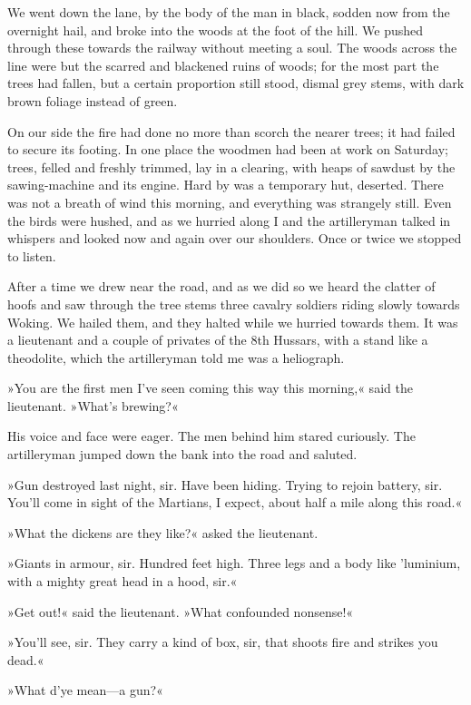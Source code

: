 We went down the lane, by the body of the man in black, sodden now from the overnight hail, and broke into the woods at the foot of the hill. We pushed through these towards the railway without meeting a soul. The woods across the line were but the scarred and blackened ruins of woods; for the most part the trees had fallen, but a certain proportion still stood, dismal grey stems, with dark brown foliage instead of green.

On our side the fire had done no more than scorch the nearer trees; it had failed to secure its footing. In one place the woodmen had been at work on Saturday; trees, felled and freshly trimmed, lay in a clearing, with heaps of sawdust by the sawing-machine and its engine. Hard by was a temporary hut, deserted. There was not a breath of wind this morning, and everything was strangely still. Even the birds were hushed, and as we hurried along I and the artilleryman talked in whispers and looked now and again over our shoulders. Once or twice we stopped to listen.



After a time we drew near the road, and as we did so we heard the clatter of hoofs and saw through the tree stems three cavalry soldiers riding slowly towards Woking. We hailed them, and they halted while we hurried towards them. It was a lieutenant and a couple of privates of the 8th Hussars, with a stand like a theodolite, which the artilleryman told me was a heliograph.

»You are the first men I've seen coming this way this morning,« said the lieutenant. »What's brewing?«

His voice and face were eager. The men behind him stared curiously. The artilleryman jumped down the bank into the road and saluted.

»Gun destroyed last night, sir. Have been hiding. Trying to rejoin battery, sir. You'll come in sight of the Martians, I expect, about half a mile along this road.«

»What the dickens are they like?« asked the lieutenant.

»Giants in armour, sir. Hundred feet high. Three legs and a body like 'luminium, with a mighty great head in a hood, sir.«

»Get out!« said the lieutenant. »What confounded nonsense!«

»You'll see, sir. They carry a kind of box, sir, that shoots fire and strikes you dead.«

»What d'ye mean—a gun?«

